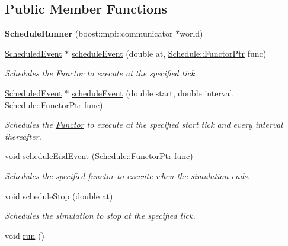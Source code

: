 \subsection*{Public Member Functions}
\begin{DoxyCompactItemize}
\item 
\hypertarget{classrepast_1_1_schedule_runner_a160f14417f2400eb2b569edb18ec43f9}{{\bfseries Schedule\-Runner} (boost\-::mpi\-::communicator $\ast$world)}\label{classrepast_1_1_schedule_runner_a160f14417f2400eb2b569edb18ec43f9}

\item 
\hyperlink{classrepast_1_1_scheduled_event}{Scheduled\-Event} $\ast$ \hyperlink{classrepast_1_1_schedule_runner_a607b44e70ad07b8d62cdce1426fb2ddc}{schedule\-Event} (double at, \hyperlink{classrepast_1_1_schedule_a6a31b68f08a9bb28381ffe02b18f1df3}{Schedule\-::\-Functor\-Ptr} func)
\begin{DoxyCompactList}\small\item\em Schedules the \hyperlink{classrepast_1_1_functor}{Functor} to execute at the specified tick. \end{DoxyCompactList}\item 
\hyperlink{classrepast_1_1_scheduled_event}{Scheduled\-Event} $\ast$ \hyperlink{classrepast_1_1_schedule_runner_a7e043ad51b6f5f7eae71d479e0eae471}{schedule\-Event} (double start, double interval, \hyperlink{classrepast_1_1_schedule_a6a31b68f08a9bb28381ffe02b18f1df3}{Schedule\-::\-Functor\-Ptr} func)
\begin{DoxyCompactList}\small\item\em Schedules the \hyperlink{classrepast_1_1_functor}{Functor} to execute at the specified start tick and every interval thereafter. \end{DoxyCompactList}\item 
void \hyperlink{classrepast_1_1_schedule_runner_a52e62ccda4dc3288c90586d91701ed60}{schedule\-End\-Event} (\hyperlink{classrepast_1_1_schedule_a6a31b68f08a9bb28381ffe02b18f1df3}{Schedule\-::\-Functor\-Ptr} func)
\begin{DoxyCompactList}\small\item\em Schedules the specified functor to execute when the simulation ends. \end{DoxyCompactList}\item 
void \hyperlink{classrepast_1_1_schedule_runner_a86fa8a634ef091adeaa43d03b040060f}{schedule\-Stop} (double at)
\begin{DoxyCompactList}\small\item\em Schedules the simulation to stop at the specified tick. \end{DoxyCompactList}\item 
\hypertarget{classrepast_1_1_schedule_runner_afc5cb8954438ed0a9ff665396b2f2994}{void \hyperlink{classrepast_1_1_schedule_runner_afc5cb8954438ed0a9ff665396b2f2994}{run} ()}\label{classrepast_1_1_schedule_runner_afc5cb8954438ed0a9ff665396b2f2994}


\end{DoxyCompactItemize}
